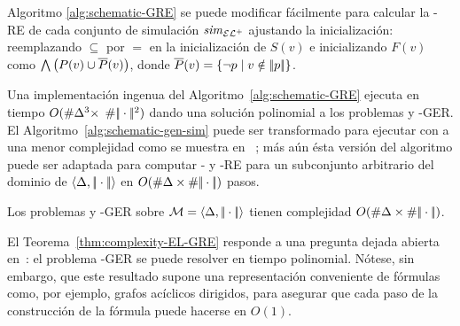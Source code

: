 Algoritmo \ref{alg:schematic-GRE} se puede modificar f\'acilmente para
calcular la \ELAN-RE de cada conjunto de simulaci\'on ${\it sim}_{{\mathcal{EL}^+}}$ 
ajustando la inicializaci\'on: reemplazando $\subseteq$ por $=$ en la
inicializaci\'on de $S(v)$ e inicializando $F(v)$ como
$\bigwedge\left(P(v)\cup\overline {P}(v)\right)$,
donde $\overline {P}(v)=\{\lnot p\mid v\notin|\!|p|\!|\}$.


Una implementaci\'on ingenua del Algoritmo~\ref{alg:schematic-GRE}
ejecuta en tiempo $O(\# \Delta^3\times$
$\# |\!|\cdot|\!|^2)$
dando una soluci\'on polinomial a los problemas \EL y \ELAN-GER.
El Algoritmo~\ref{alg:schematic-gen-sim} puede ser transformado para ejecutar con a una menor complejidad como se muestra en
~\cite{HHK95}; m\'as a\'un \'esta versi\'on del algoritmo puede ser adaptada para
computar \EL- y \ELAN-RE para un subconjunto arbitrario del dominio de $\langle \Delta,|\!|\cdot|\!| \rangle$
 en $O(\# \Delta\times\# |\!|\cdot|\!|)$ pasos. 


%

%
\newtheorem{theorema}{Teorema}
\begin{theorem}\label{thm:complexity-EL-GRE}
Los problemas \EL y \ELAN-GER sobre $\mathcal{M}=\langle \Delta,|\!|\cdot|\!| \rangle$ tienen complejidad
$O(\# \Delta\times\# |\!|\cdot|\!|)$.
\end{theorem}



El Teorema~\ref{thm:complexity-EL-GRE} responde a una pregunta dejada abierta
en~\cite{areces08}: el problema \EL-GER se puede resolver en tiempo polinomial. N\'otese, sin embargo, que este resultado supone una representaci\'on conveniente de
f\'ormulas como, por ejemplo, grafos ac\'iclicos dirigidos, para asegurar que
cada paso de la construcci\'on de la f\'ormula puede hacerse en $O(1)$. %

